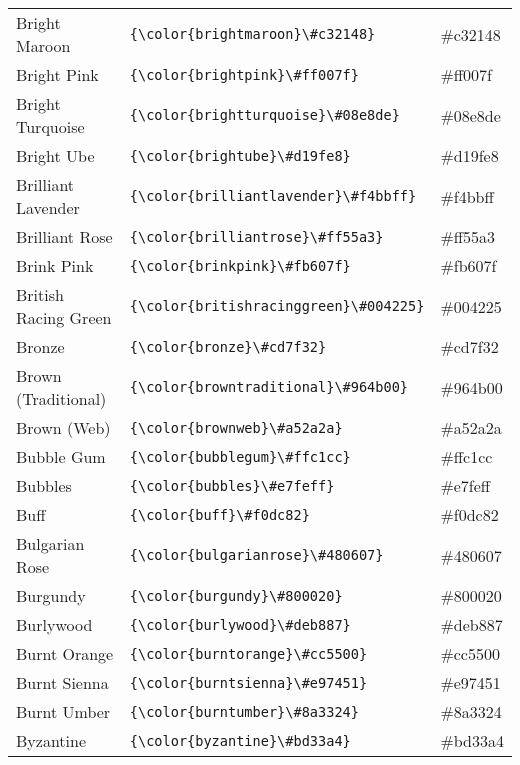 \documentclass[9.5pt]{article}
\begin{document}
\begin{longtable}{l | l | l}
	Bright Maroon & \verb!{\color{brightmaroon}\#c32148}! & {\color{brightmaroon}\#c32148}\\
	Bright Pink & \verb!{\color{brightpink}\#ff007f}! & {\color{brightpink}\#ff007f}\\
	Bright Turquoise & \verb!{\color{brightturquoise}\#08e8de}! & {\color{brightturquoise}\#08e8de}\\
	Bright Ube & \verb!{\color{brightube}\#d19fe8}! & {\color{brightube}\#d19fe8}\\
	Brilliant Lavender & \verb!{\color{brilliantlavender}\#f4bbff}! & {\color{brilliantlavender}\#f4bbff}\\
	Brilliant Rose & \verb!{\color{brilliantrose}\#ff55a3}! & {\color{brilliantrose}\#ff55a3}\\
	Brink Pink & \verb!{\color{brinkpink}\#fb607f}! & {\color{brinkpink}\#fb607f}\\
	British Racing Green & \verb!{\color{britishracinggreen}\#004225}! & {\color{britishracinggreen}\#004225}\\
	Bronze & \verb!{\color{bronze}\#cd7f32}! & {\color{bronze}\#cd7f32}\\
	Brown (Traditional) & \verb!{\color{browntraditional}\#964b00}! & {\color{browntraditional}\#964b00}\\
	Brown (Web) & \verb!{\color{brownweb}\#a52a2a}! & {\color{brownweb}\#a52a2a}\\
	Bubble Gum & \verb!{\color{bubblegum}\#ffc1cc}! & {\color{bubblegum}\#ffc1cc}\\
	Bubbles & \verb!{\color{bubbles}\#e7feff}! & {\color{bubbles}\#e7feff}\\
	Buff & \verb!{\color{buff}\#f0dc82}! & {\color{buff}\#f0dc82}\\
	Bulgarian Rose & \verb!{\color{bulgarianrose}\#480607}! & {\color{bulgarianrose}\#480607}\\
	Burgundy & \verb!{\color{burgundy}\#800020}! & {\color{burgundy}\#800020}\\
	Burlywood & \verb!{\color{burlywood}\#deb887}! & {\color{burlywood}\#deb887}\\
	Burnt Orange & \verb!{\color{burntorange}\#cc5500}! & {\color{burntorange}\#cc5500}\\
	Burnt Sienna & \verb!{\color{burntsienna}\#e97451}! & {\color{burntsienna}\#e97451}\\
	Burnt Umber & \verb!{\color{burntumber}\#8a3324}! & {\color{burntumber}\#8a3324}\\
	Byzantine & \verb!{\color{byzantine}\#bd33a4}! & {\color{byzantine}\#bd33a4}\\

\end{longtable}
\end{document}
